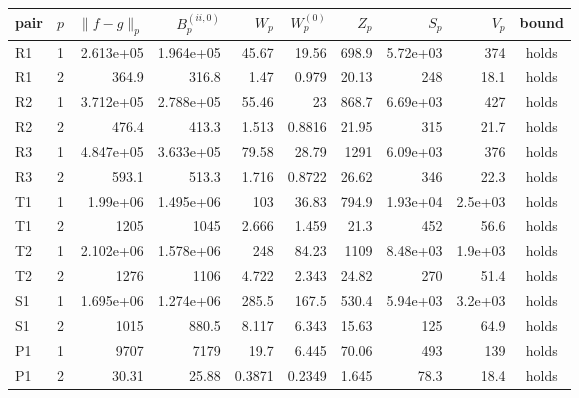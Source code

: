 \begin{tabular}{llrrrrrrrc}
\toprule
pair & $p$ & $\|f-g\|_p$ & $B_p^{(ii,0)}$ & $W_p$ & $W_p^{(0)}$ & $Z_p$ & $S_p$ & $V_p$ & bound \\
\midrule
R1 & 1 & 2.613e+05 & 1.964e+05 & 45.67 & 19.56 & 698.9 & 5.72e+03 & 374 & holds \\
R1 & 2 & 364.9 & 316.8 & 1.47 & 0.979 & 20.13 & 248 & 18.1 & holds \\
R2 & 1 & 3.712e+05 & 2.788e+05 & 55.46 & 23 & 868.7 & 6.69e+03 & 427 & holds \\
R2 & 2 & 476.4 & 413.3 & 1.513 & 0.8816 & 21.95 & 315 & 21.7 & holds \\
R3 & 1 & 4.847e+05 & 3.633e+05 & 79.58 & 28.79 & 1291 & 6.09e+03 & 376 & holds \\
R3 & 2 & 593.1 & 513.3 & 1.716 & 0.8722 & 26.62 & 346 & 22.3 & holds \\
T1 & 1 & 1.99e+06 & 1.495e+06 & 103 & 36.83 & 794.9 & 1.93e+04 & 2.5e+03 & holds \\
T1 & 2 & 1205 & 1045 & 2.666 & 1.459 & 21.3 & 452 & 56.6 & holds \\
T2 & 1 & 2.102e+06 & 1.578e+06 & 248 & 84.23 & 1109 & 8.48e+03 & 1.9e+03 & holds \\
T2 & 2 & 1276 & 1106 & 4.722 & 2.343 & 24.82 & 270 & 51.4 & holds \\
S1 & 1 & 1.695e+06 & 1.274e+06 & 285.5 & 167.5 & 530.4 & 5.94e+03 & 3.2e+03 & holds \\
S1 & 2 & 1015 & 880.5 & 8.117 & 6.343 & 15.63 & 125 & 64.9 & holds \\
P1 & 1 & 9707 & 7179 & 19.7 & 6.445 & 70.06 & 493 & 139 & holds \\
P1 & 2 & 30.31 & 25.88 & 0.3871 & 0.2349 & 1.645 & 78.3 & 18.4 & holds \\
\bottomrule
\end{tabular}
